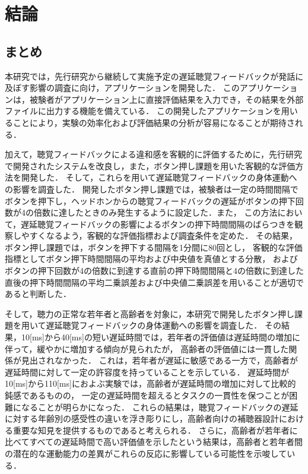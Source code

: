 \chapter{結論}
\section{まとめ}
本研究では，先行研究から継続して実施予定の遅延聴覚フィードバックが発話に及ぼす影響の調査に向け，アプリケーションを開発した．
このアプリケーションは，被験者がアプリケーション上に直接評価結果を入力でき，その結果を外部ファイルに出力する機能を備えている．
この開発したアプリケーションを用いることにより，実験の効率化および評価結果の分析が容易になることが期待される．

加えて，聴覚フィードバックによる違和感を客観的に評価するために，先行研究\cite{shigematu}で開発されたシステムを改良し，また，ボタン押し課題を用いた客観的な評価方法を開発した．
そして，これらを用いて遅延聴覚フィードバックの身体運動への影響を調査した．
開発したボタン押し課題では，被験者は一定の時間間隔でボタンを押下し，ヘッドホンからの聴覚フィードバックの遅延がボタンの押下回数が4の倍数に達したときのみ発生するように設定した．また，
この方法において，遅延聴覚フィードバックの影響によるボタンの押下時間間隔のばらつきを観察しやすくなるよう，客観的な評価指標および調査条件を定めた．
その結果，ボタン押し課題では，ボタンを押下する間隔を1分間に80回とし，
客観的な評価指標としてボタン押下時間間隔の平均および中央値を真値とする分散，
およびボタンの押下回数が4の倍数に到達する直前の押下時間間隔と4の倍数に到達した直後の押下時間間隔の平均二乗誤差および中央値二乗誤差を用いることが適切であると判断した．

そして，聴力の正常な若年者と高齢者を対象に，本研究で開発したボタン押し課題を用いて遅延聴覚フィードバックの身体運動への影響を調査した．
その結果，10[ms]から40[ms]の短い遅延時間では，若年者の評価値は遅延時間の増加に伴って，緩やかに増加する傾向が見られたが，
高齢者の評価値には一貫した関係が見出されなかった．
これは，若年者が遅延に敏感である一方で，高齢者が遅延時間に対して一定の許容度を持っていることを示している．
遅延時間が10[ms]から110[ms]におよぶ実験では，高齢者が遅延時間の増加に対して比較的鈍感であるものの，
一定の遅延時間を超えるとタスクの一貫性を保つことが困難になることが明らかになった．
これらの結果は，聴覚フィードバックの遅延に対する年齢別の感受性の違いを浮き彫りにし，高齢者向けの補聴器設計における重要な知見を提供するものであると考えられる．
さらに，高齢者が若年者に比べてすべての遅延時間で高い評価値を示したという結果は，高齢者と若年者間の潜在的な運動能力の差異がこれらの反応に影響している可能性を示唆している．
